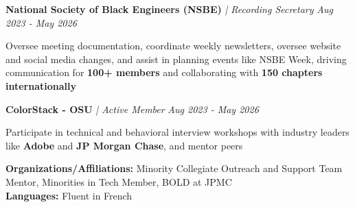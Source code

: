 \documentclass[letterpaper]{article}
\begin{document}
\vspace{1mm}

    \textbf{National Society of Black Engineers (NSBE)} \textit{| Recording Secretary} \hfill \textsl{Aug 2023 - May 2026}\\
    \vspace{-2mm}
    \begin{tightitemize} \itemsep -1mm
    
        \item Oversee meeting documentation, coordinate weekly newsletters, oversee website and social media changes, and assist in planning events like NSBE Week, driving communication for \textbf{100+ members} and collaborating with \textbf{150 chapters internationally}
        
    \end{tightitemize}
    \vspace{-1mm}

    \textbf{ColorStack - OSU} \textit{| Active Member} \hfill \textsl{Aug 2023 - May 2026}\\
    \vspace{-2mm}
    \begin{tightitemize} \itemsep -1mm
    
        \item Participate in technical and behavioral interview workshops with industry leaders like \textbf{Adobe} and \textbf{JP Morgan Chase}, and mentor peers
        
    \end{tightitemize}
    \vspace{-1mm}

\vspace{1mm}

    \textbf{Organizations/Affiliations:} Minority Collegiate Outreach and Support Team Mentor, Minorities in Tech Member, BOLD at JPMC \\
    \textbf{Languages:} Fluent in French \\
\vspace{2mm}
\end{document}
